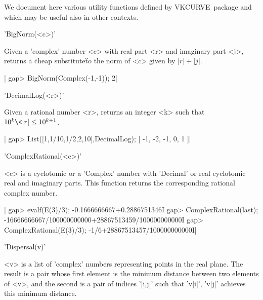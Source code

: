\def\VKCURVE{{\sf VKCURVE}}
\def\CHEVIE{{\sf CHEVIE}}

We document here various utility functions defined by \VKCURVE\ package and
which may be useful also in other contexts.


'BigNorm(<c>)'

Given  a 'complex' number  <c> with real  part <r> and  imaginary part <j>,
returns a \"cheap substitute\" to the norm of <c> given by $|r|+|j|$.

|    gap> BigNorm(Complex(-1,-1));
    2|


'DecimalLog(<r>)'

Given  a rational number <r>, returns an  integer <k> such that $10^k\< |r|
\le 10^{k+1}$.

|    gap> List([1,1/10,1/2,2,10],DecimalLog);
    [ -1, -2, -1, 0, 1 ]|


'ComplexRational(<c>)'

<c> is a cyclotomic or a 'Complex' number with 'Decimal' or real cyclotomic
real  and imaginary parts. This function returns the corresponding rational
complex number.

|    gap> evalf(E(3)/3);
    -0.1666666667+0.2886751346I
    gap> ComplexRational(last);
    -16666666667/100000000000+28867513459/100000000000I
    gap> ComplexRational(E(3)/3);
    -1/6+28867513457/100000000000I|


'Dispersal(v)'

<v>  is a list of 'complex' numbers  representing points in the real plane.
The  result is a pair  whose first element is  the minimum distance between
two  elements of <v>, and the second is a pair of indices '[i,j]' such that
'v[i]', 'v[j]' achieves this minimum distance.

